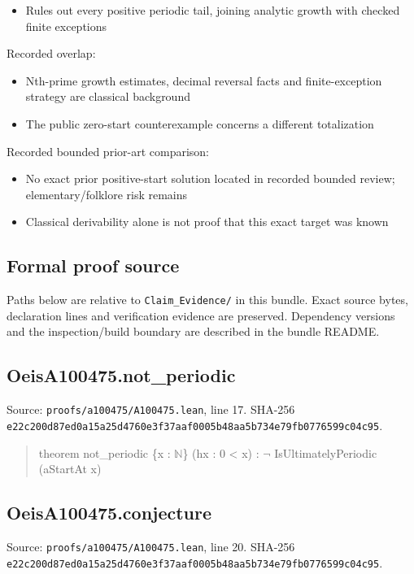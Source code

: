 \documentclass[11pt,a4paper]{article}
\begin{document}
\begin{itemize}
\item Rules out every positive periodic tail, joining analytic growth with checked finite exceptions
\end{itemize}
Recorded overlap:

\begin{itemize}
\item Nth-prime growth estimates, decimal reversal facts and finite-exception strategy are classical background
\end{itemize}
\begin{itemize}
\item The public zero-start counterexample concerns a different totalization
\end{itemize}
Recorded bounded prior-art comparison:

\begin{itemize}
\item No exact prior positive-start solution located in recorded bounded review; elementary/folklore risk remains
\end{itemize}
\begin{itemize}
\item Classical derivability alone is not proof that this exact target was known
\end{itemize}
\subsection{Formal proof source}
Paths below are relative to \texttt{Claim\_Evidence/} in this bundle. Exact source bytes, declaration lines and verification evidence are preserved. Dependency versions and the inspection/build boundary are described in the bundle README.

\subsection{OeisA100475.not\_periodic}
Source: \texttt{proofs/a100475/A100475.lean}, line 17. SHA-256 \texttt{e22c200d87ed0a15a25d4760e3f37aaf0005b48aa5b734e79fb0776599c04c95}.

\begin{quote}\small\ttfamily theorem not\_periodic \{x : \ensuremath{\mathbb{N}}\} (hx : 0 < x) : \ensuremath{\neg} IsUltimatelyPeriodic (aStartAt x)\end{quote}
\subsection{OeisA100475.conjecture}
Source: \texttt{proofs/a100475/A100475.lean}, line 20. SHA-256 \texttt{e22c200d87ed0a15a25d4760e3f37aaf0005b48aa5b734e79fb0776599c04c95}.
\end{document}
